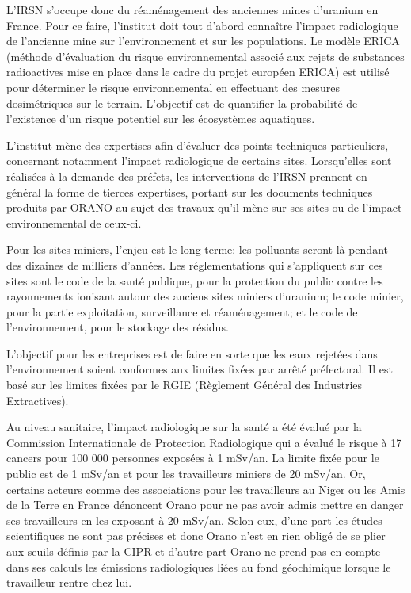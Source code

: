 \documentclass{article}
\begin{document}
L’IRSN s’occupe donc  du réaménagement des anciennes mines d’uranium en France. Pour ce faire, l’institut doit tout d’abord connaître l’impact radiologique de l’ancienne mine sur l’environnement et sur les populations. Le modèle ERICA (méthode d’évaluation du risque environnemental associé aux rejets de substances radioactives mise en place dans le cadre du projet européen ERICA) est utilisé pour déterminer  le risque environnemental en effectuant des mesures dosimétriques sur le terrain. L’objectif est de quantifier la probabilité de l’existence d’un risque potentiel sur les écosystèmes aquatiques.

L’institut  mène  des  expertises  afin  d’évaluer  des  points  techniques  particuliers,  concernant notamment l’impact radiologique de certains sites. Lorsqu’elles sont réalisées à la demande des préfets, les interventions de l’IRSN prennent en général la forme de tierces expertises, portant sur les documents techniques produits par ORANO au sujet des travaux qu’il mène sur  ses  sites  ou  de  l’impact  environnemental  de  ceux-ci.

Pour les sites miniers, l’enjeu est le long terme: les polluants seront là pendant des dizaines de milliers d’années. Les réglementations qui s’appliquent sur ces sites sont le code de la santé publique, pour la protection du public contre les rayonnements ionisant autour des anciens sites miniers d’uranium; le code minier, pour la partie exploitation, surveillance et réaménagement; et le code de l’environnement, pour le stockage des résidus.

L’objectif pour les entreprises est de faire en sorte que les eaux rejetées dans l’environnement   soient conformes aux limites fixées par arrêté préfectoral. Il est  basé sur les limites fixées par le RGIE (Règlement Général des Industries Extractives).

Au niveau sanitaire, l’impact radiologique sur la santé a été évalué par la Commission Internationale de Protection Radiologique qui a évalué le risque à 17 cancers pour 100 000 personnes exposées à 1 mSv/an. La limite fixée pour le public est de 1 mSv/an et pour les travailleurs miniers de 20 mSv/an. Or, certains acteurs comme des associations pour les travailleurs au Niger ou les Amis de la Terre en France dénoncent Orano pour ne pas avoir admis mettre en danger ses travailleurs en les exposant à 20 mSv/an. Selon eux, d’une part les études scientifiques ne sont pas précises et donc Orano n’est en rien obligé de se plier aux seuils définis par la CIPR et d’autre part Orano ne prend pas en compte dans ses calculs les émissions radiologiques liées au fond géochimique lorsque le travailleur rentre chez lui.
\end{document}
